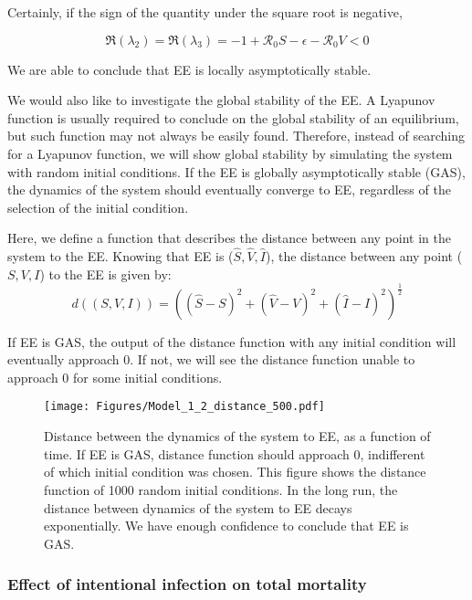 \documentclass[12pt]{article}
\newcommand{\R}{\mathcal{R}}
\begin{document}
Certainly, if the sign of the quantity under the square root is negative,
\begin{linenomath*}
\begin{equation}
\Re(\lambda_2)=\Re(\lambda_3)=-1+\R_0 S-\epsilon-\R_0 V<0
\end{equation}
\end{linenomath*}

We are able to conclude that EE is locally asymptotically stable.

We would also like to investigate the global stability of the EE. A Lyapunov function is usually required to conclude on the global stability of an equilibrium, but such function may not always be easily found. Therefore, instead of searching for a Lyapunov function, we will show global stability by simulating the system with random initial conditions. If the EE is globally asymptotically stable (GAS), the dynamics of the system should eventually converge to EE, regardless of the selection of the initial condition.

Here, we define a function that describes the distance between any point in the system to the EE. Knowing that EE is ($\hat{S}, \hat{V},\hat{I}$), the distance between any point ($S,V,I$) to the EE is given by:
\begin{equation}
d((S,V,I))=((\hat{S}-S)^2+(\hat{V}-V)^2+(\hat{I}-I)^2)^{\frac{1}{2}}
\end{equation}

If EE is GAS, the output of the distance function with any initial condition will eventually approach 0. If not, we will see the distance function unable to approach 0 for some initial conditions.

\begin{figure}[H]
  \centering
  \texttt{[image: Figures/Model\_1\_2\_distance\_500.pdf]}
  \caption{Distance between the dynamics of the system to EE, as a function of time. If EE is GAS, distance function should approach 0, indifferent of which initial condition was chosen. This figure shows the distance function of 1000 random initial conditions. In the long run, the distance between dynamics of the system to EE decays exponentially. We have enough confidence to conclude that EE is GAS.}
\end{figure}

\subsubsection{Effect of intentional infection on total mortality}\label{section2.2.3}
\end{document}
